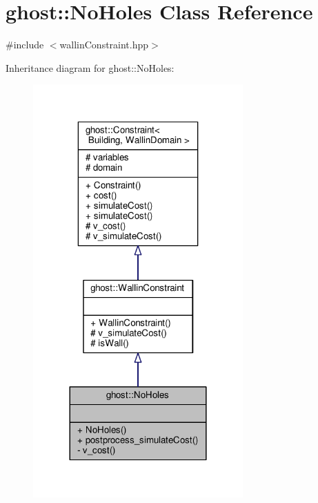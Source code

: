 \hypertarget{classghost_1_1NoHoles}{\section{ghost\-:\-:No\-Holes Class Reference}
\label{classghost_1_1NoHoles}
}


{\ttfamily \#include $<$wallin\-Constraint.\-hpp$>$}



Inheritance diagram for ghost\-:\-:No\-Holes\-:
\nopagebreak
\begin{figure}[H]
\begin{center}
\leavevmode
\includegraphics[width=228pt]{classghost_1_1NoHoles__inherit__graph}
\end{center}
\end{figure}


